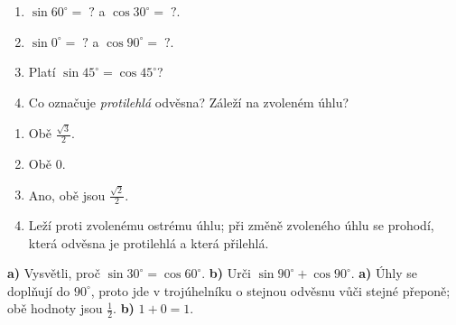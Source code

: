 \documentclass[11pt,a4paper]{article}
\begin{document}
\begin{zadaniReseniBox}[title={S1: doplň bez kalkulačky},breakable=false]
\begin{enumerate}[label=\alph*)]
\item $\sin60^\circ=\;?$ a $\cos30^\circ=\;?$.
\item $\sin0^\circ=\;?$ a $\cos90^\circ=\;?$.
\item Platí $\sin45^\circ=\cos45^\circ$?
\item Co označuje \emph{protilehlá} odvěsna? Záleží na zvoleném úhlu?
\end{enumerate}
\tcblower
\begin{enumerate}[label=\alph*)]
\item Obě $\frac{\sqrt3}{2}$.
\item Obě $0$.
\item Ano, obě jsou $\frac{\sqrt2}{2}$.
\item Leží proti zvolenému ostrému úhlu; při změně zvoleného úhlu
se prohodí, která odvěsna je protilehlá a která přilehlá.
\end{enumerate}
\end{zadaniReseniBox}

\begin{zadaniReseniBox}[title={D1: dvě rychlé otázky},breakable=false]
\textbf{a)} Vysvětli, proč $\sin30^\circ=\cos60^\circ$.
\quad \textbf{b)} Urči $\sin90^\circ+\cos90^\circ$.
\tcblower
\textbf{a)} Úhly se doplňují do $90^\circ$, proto jde
v trojúhelníku o stejnou odvěsnu vůči stejné přeponě;
obě hodnoty jsou $\frac12$.
\quad \textbf{b)} $1+0=1$.
\end{zadaniReseniBox}
\end{document}
